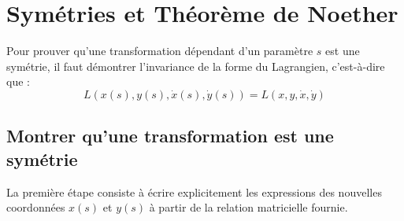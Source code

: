 \documentclass[french]{yLectureNote}
\begin{document}





\section{ Symétries et Théorème de Noether}
Pour prouver qu'une transformation dépendant d'un paramètre $s$ est une symétrie, il faut démontrer l'invariance de la forme du Lagrangien, c'est-à-dire que :
$$ L(x(s), y(s), \dot{x}(s), \dot{y}(s)) = L(x, y, \dot{x}, \dot{y}) $$

\subsection*{Montrer qu'une transformation est une symétrie}
La première étape consiste à écrire explicitement les expressions des nouvelles coordonnées $x(s)$ et $y(s)$ à partir de la relation matricielle fournie.
\end{document}
